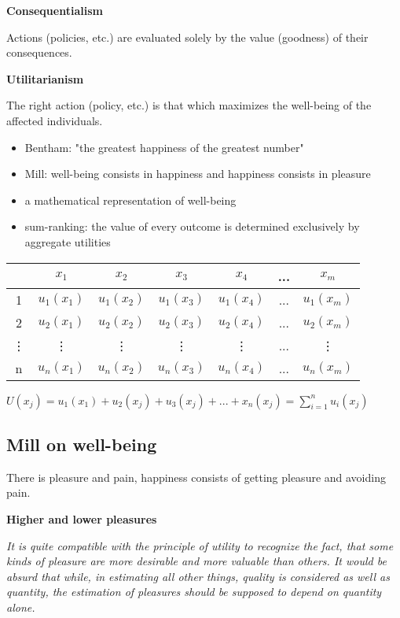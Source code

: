 \textbf{Consequentialism}

Actions (policies, etc.) are evaluated solely by the value (goodness) of
their consequences.

\textbf{Utilitarianism}

The right action (policy, etc.) is that which maximizes the well-being of the
affected individuals.

\begin{itemize}
    \item Bentham: "the greatest happiness of the greatest number"
    \item Mill: well-being consists in happiness and happiness consists in
    pleasure
    \item a mathematical representation of well-being
    \item sum-ranking: the value of every outcome is determined exclusively
    by aggregate utilities
\end{itemize}

\begin{tabular}{c|c c c c c c}
     & $x_1$ & $x_2$ & $x_3$ & $x_4$ & ... & $x_m$ \\
     \hline
     1 & $u_1(x_1)$ & $u_1(x_2)$ & $u_1(x_3)$ & $u_1(x_4)$ & ... & $u_1(x_m)$\\
     2 & $u_2(x_1)$ & $u_2(x_2)$ & $u_2(x_3)$ & $u_2(x_4)$ & ... & $u_2(x_m)$\\
     \vdots & \vdots & \vdots & \vdots & \vdots & ... & \vdots \\
     n & $u_n(x_1)$ & $u_n(x_2)$ & $u_n(x_3)$ & $u_n(x_4)$ & ... & $u_n(x_m)$\\
\end{tabular}

$U(x_j) = u_1(x_1) + u_2(x_j) + u_3(x_j) + ... + x_n(x_j) =
\sum_{i=1}^{n} u_i(x_j)$

\subsection{Mill on well-being}

There is pleasure and pain, happiness consists of getting pleasure and
avoiding pain.

\textbf{Higher and lower pleasures}

\textit{It is quite compatible with the principle of utility to recognize the
fact, that some kinds of pleasure are more desirable and more valuable than
others. It would be absurd that while, in estimating all other things, quality
is considered as well as quantity, the estimation of pleasures should be
supposed to depend on quantity alone.}

